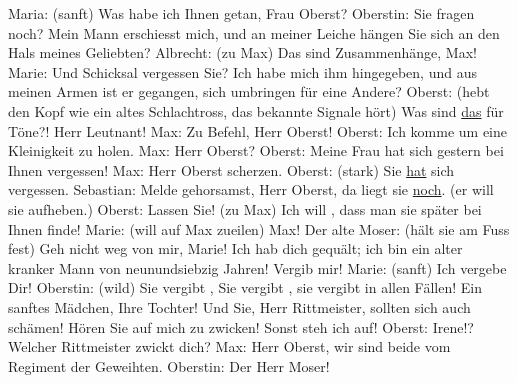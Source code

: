            \pstart
           Maria: (sanft) Was habe ich Ihnen getan, Frau Oberst?\pend
           \pstart
           Oberstin: Sie fragen noch? Mein Mann erschiesst mich, und an meiner Leiche hängen
					Sie sich an den Hals meines Geliebten?\pend
           \pstart
           Albrecht: (zu Max) Das sind  Zusammenhänge,
					Max!\pend
           \pstart
           Marie: Und  Schicksal vergessen Sie? Ich habe mich
					ihm hingegeben, und aus meinen Armen ist er gegangen, sich umbringen für eine
					Andere? \label{K_L01900-1v}\label{K_L01900-1h}\pend
           \pstart
           Oberst: (hebt den Kopf wie ein altes Schlachtross, das bekannte Signale hört) Was
					sind \uline{das} für Töne?! Herr Leutnant!\pend
           \pstart
           Max: Zu Befehl, Herr Oberst!\pend
           \pstart
           Oberst: Ich komme um eine Kleinigkeit zu holen.\pend
           \pstart
           Max: Herr Oberst?\pend
           \pstart
           {\pb}Oberst: Meine Frau hat sich
					gestern bei Ihnen vergessen!\pend
           \pstart
           Max: Herr Oberst scherzen.\pend
           \pstart
           Oberst: (stark) Sie \uline{hat} sich vergessen.\pend
           \pstart
           Sebastian: Melde gehorsamst, Herr Oberst, da liegt sie \uline{noch}. (er will sie aufheben.)\pend
           \pstart
           Oberst: Lassen Sie! (zu Max) Ich will , dass
					man sie später bei Ihnen finde!\pend
           \pstart
           Marie: (will auf Max zueilen) Max!\pend
           \pstart
           Der alte Moser: (hält sie am Fuss fest) Geh nicht weg von mir, Marie! Ich hab
					dich gequält; ich bin ein alter kranker Mann von neunundsiebzig Jahren! Vergib
					mir!\pend
           \pstart
           Marie: (sanft) Ich vergebe Dir!\pend
           \pstart
           Oberstin: (wild) Sie vergibt , Sie vergibt , sie vergibt in allen Fällen! Ein sanftes
					Mädchen, Ihre Tochter! Und Sie, Herr Rittmeister, sollten sich auch schämen!
					Hören Sie auf mich zu zwicken! Sonst steh ich auf!\pend
           \pstart
           Oberst: Irene!? Welcher Rittmeister zwickt dich?\pend
           \pstart
           Max: Herr Oberst, wir sind beide vom Regiment der Geweihten.\pend
           \pstart
           Oberstin: Der Herr Moser!\pend
